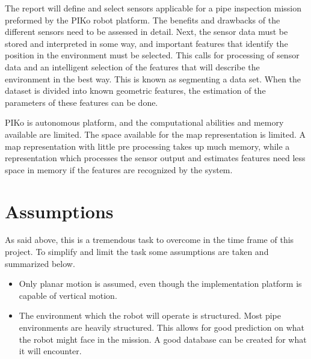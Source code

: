 The report will define and select sensors applicable for a pipe inspection mission
preformed by the PIKo robot platform. The benefits and drawbacks of the different sensors
need to be assessed in detail. Next, the sensor data must be stored and interpreted in some
way, and important features that identify the position in the environment must be selected. 
This calls for processing of sensor data and an intelligent selection of the features that
will describe the environment in the best way. This is known as segmenting a data set.
When the dataset is divided into known geometric features, the estimation of the
parameters of these features can be done. 

PIKo is autonomous platform, and the computational abilities and memory available
are limited. The space available for the map representation is limited.
A map representation with little pre processing takes up much memory, while a
representation which processes the sensor output and estimates features need less space in
memory if the features are recognized by the system. 


\section{Assumptions}
As said above, this is a tremendous task to overcome in the time frame of this project. To
simplify and limit the task some assumptions are taken and summarized below. 
\begin{itemize}
    \item Only planar motion is assumed, even though the implementation platform is
    capable of vertical motion. 
    \item The environment which the robot will operate is structured. Most pipe
    environments are heavily structured. This allows for good prediction on what the robot
    might face in the mission. A good database can be created for what it will encounter. 
\end{itemize}

